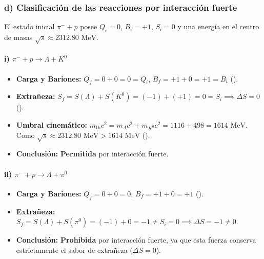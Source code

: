 \begin{problema}
\subsubsection*{d) Clasificación de las reacciones por interacción fuerte}

El estado inicial $\pi^- + p$ posee $Q_i = 0$, $B_i = +1$, $S_i = 0$ y una energía en el centro de masas $\sqrt{s} \approx 2312.80\text{ MeV}$.

\paragraph{i) $\pi^- + p \longrightarrow \Lambda + K^0$}
\begin{itemize}
    \item \textbf{Carga y Bariones:} $Q_f = 0 + 0 = 0 = Q_i$, $B_f = +1 + 0 = +1 = B_i$ (\checkmark).
    \item \textbf{Extrañeza:} $S_f = S(\Lambda) + S(K^0) = (-1) + (+1) = 0 = S_i \implies \Delta S = 0$ (\checkmark).
    \item \textbf{Umbral cinemático:} $m_{\text{th}} c^2 = m_\Lambda c^2 + m_{K^0} c^2 = 1116 + 498 = 1614\text{ MeV}$. Como $\sqrt{s} \approx 2312.80\text{ MeV} > 1614\text{ MeV}$ (\checkmark).
    \item \textbf{Conclusión:} \textbf{Permitida} por interacción fuerte.
\end{itemize}

\paragraph{ii) $\pi^- + p \longrightarrow \Lambda + \pi^0$}
\begin{itemize}
    \item \textbf{Carga y Bariones:} $Q_f = 0 + 0 = 0$, $B_f = +1 + 0 = +1$ (\checkmark).
    \item \textbf{Extrañeza:} $S_f = S(\Lambda) + S(\pi^0) = (-1) + 0 = -1 \neq S_i = 0 \implies \Delta S = -1 \neq 0$.
    \item \textbf{Conclusión:} \textbf{Prohibida} por interacción fuerte, ya que esta fuerza conserva estrictamente el sabor de extrañeza ($\Delta S = 0$).
\end{itemize}


\end{problema}
